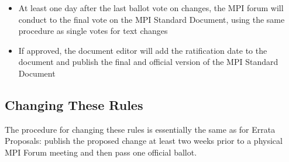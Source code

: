 {{\begin{enumerate}
\begin{enumerate}
\begin{itemize}
      approved with a single vote using the same procedure as single
      votes for text changes
      \begin{itemize}
      \item If a ballot fails, the respective change will be backed
        out of the final draft
      \end{itemize}
    \item At least one day after the last ballot vote on changes, the
      MPI forum will conduct to the final vote on the MPI Standard
      Document, using the same procedure as single votes for text
      changes
    \item If approved, the document editor will add the ratification
      date to the document and publish the final and official version
      of the MPI Standard Document
    \end{itemize}
  \end{enumerate}
\end{enumerate}

}} %


\subsection{Changing These Rules}

The procedure for changing these rules is essentially the same as for
Errata Proposals: publish the proposed change at least two weeks prior
to a physical MPI Forum meeting and then pass one official ballot.

{\color{red}{The new rules take effect as soon as they are
  approved/voted in by the MPI Forum.}}

